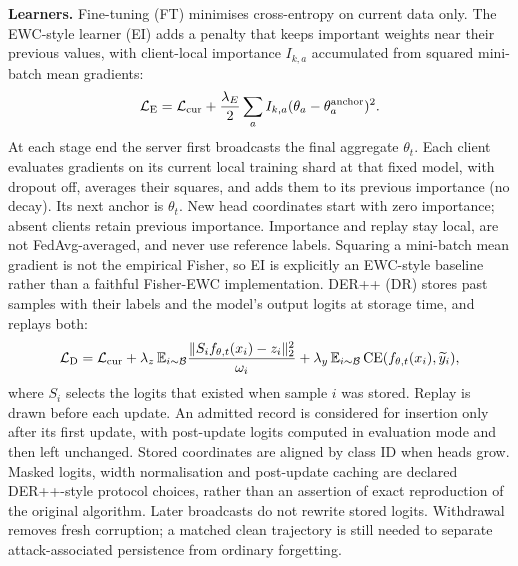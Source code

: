 \documentclass[10pt,a4paper]{article}
\newcommand{\CE}{\operatorname{CE}}
\begin{document}
\textbf{Learners.} Fine-tuning (FT) minimises cross-entropy on current data only. The EWC-style learner (EI) adds a penalty that keeps important weights near their previous values, with client-local importance $I_{k,a}$ accumulated from squared mini-batch mean gradients:
\begin{equation}
\mathcal L_{\rm E}=\mathcal L_{\rm cur}+\frac{\lambda_E}{2}\sum_aI_{k,a}(\theta_a-\theta_a^{\rm anchor})^2 .
\label{eq:ewc}
\end{equation}
At each stage end the server first broadcasts the final aggregate $\theta_t$. Each client evaluates gradients on its current local training shard at that fixed model, with dropout off, averages their squares, and adds them to its previous importance (no decay). Its next anchor is $\theta_t$. New head coordinates start with zero importance; absent clients retain previous importance. Importance and replay stay local, are not FedAvg-averaged, and never use reference labels. Squaring a mini-batch mean gradient is not the empirical Fisher, so EI is explicitly an EWC-style baseline rather than a faithful Fisher-EWC implementation.
DER++ (DR) stores past samples with their labels and the model's output logits at storage time, and replays both:
\begin{equation}
\mathcal L_{\rm D}=\mathcal L_{\rm cur}
+\lambda_z\,\mathbb E_{i\sim\mathcal B}\frac{\|S_if_{\theta,t}(x_i)-z_i\|_2^2}{\omega_i}
+\lambda_y\,\mathbb E_{i\sim\mathcal B}\CE(f_{\theta,t}(x_i),\widetilde y_i),
\label{eq:der}
\end{equation}
where $S_i$ selects the logits that existed when sample $i$ was stored. Replay is drawn before each update. An admitted record is considered for insertion only after its first update, with post-update logits computed in evaluation mode and then left unchanged. Stored coordinates are aligned by class ID when heads grow. Masked logits, width normalisation and post-update caching are declared DER++-style protocol choices, rather than an assertion of exact reproduction of the original algorithm. Later broadcasts do not rewrite stored logits. Withdrawal removes fresh corruption; a matched clean trajectory is still needed to separate attack-associated persistence from ordinary forgetting.
\end{document}

